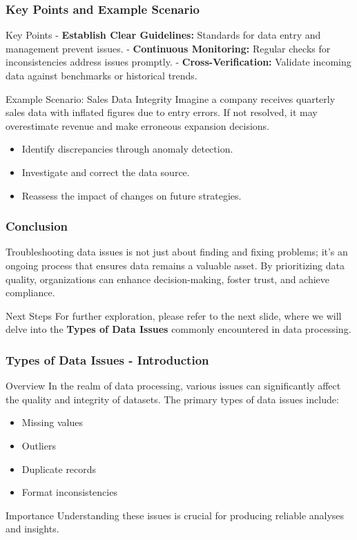 \documentclass{beamer}
\begin{document}
\begin{frame}[fragile]
    \frametitle{Key Points and Example Scenario}
    \begin{block}{Key Points}
        - \textbf{Establish Clear Guidelines:} Standards for data entry and management prevent issues.
        - \textbf{Continuous Monitoring:} Regular checks for inconsistencies address issues promptly.
        - \textbf{Cross-Verification:} Validate incoming data against benchmarks or historical trends.
    \end{block}

    \begin{block}{Example Scenario: Sales Data Integrity}
        Imagine a company receives quarterly sales data with inflated figures due to entry errors. If not resolved, it may overestimate revenue and make erroneous expansion decisions.
        \begin{itemize}
            \item Identify discrepancies through anomaly detection.
            \item Investigate and correct the data source.
            \item Reassess the impact of changes on future strategies.
        \end{itemize}
    \end{block}
\end{frame}

\begin{frame}[fragile]
    \frametitle{Conclusion}
    Troubleshooting data issues is not just about finding and fixing problems; it’s an ongoing process that ensures data remains a valuable asset. By prioritizing data quality, organizations can enhance decision-making, foster trust, and achieve compliance.
    
    \begin{block}{Next Steps}
        For further exploration, please refer to the next slide, where we will delve into the \textbf{Types of Data Issues} commonly encountered in data processing.
    \end{block}
\end{frame}

\begin{frame}[fragile]
    \frametitle{Types of Data Issues - Introduction}
    \begin{block}{Overview}
        In the realm of data processing, various issues can significantly affect the quality and integrity of datasets. The primary types of data issues include:
    \end{block}
    \begin{itemize}
        \item Missing values
        \item Outliers
        \item Duplicate records
        \item Format inconsistencies
    \end{itemize}
    \begin{block}{Importance}
        Understanding these issues is crucial for producing reliable analyses and insights.
    \end{block}
\end{frame}
\end{document}

